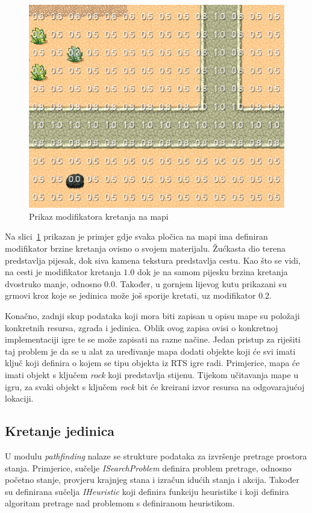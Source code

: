 \documentclass[times, utf8, zavrsni, numeric]{fer}
\begin{document}
\begin{figure}[h]
	\centering
	\includegraphics[width=0.6\linewidth]{images/tileModifiers.png}
	\caption{Prikaz modifikatora kretanja na mapi}
	\label{fig:tileModifiers}
\end{figure}

\par Na slici~\ref{fig:tileModifiers} prikazan je primjer gdje svaka pločica na mapi ima definiran modifikator brzine kretanja ovisno o svojem materijalu.
Žućkasta dio terena predstavlja pijesak, dok siva kamena tekstura predstavlja cestu.
Kao što se vidi, na cesti je modifikator kretanja \(1.0\) dok je na samom pijesku brzina kretanja dvostruko manje, odnosno \(0.0\).
Također, u gornjem lijevog kutu prikazani su grmovi kroz koje se jedinica može još sporije kretati, uz modifikator \(0.2\).

\par Konačno, zadnji skup podataka koji mora biti zapisan u opisu mape su položaji konkretnih resursa, zgrada i jedinica.
Oblik ovog zapisa ovisi o konkretnoj implementaciji igre te se može zapisati na razne načine.
Jedan pristup za riješiti taj problem je da se u alat za uređivanje mapa dodati objekte koji će svi imati ključ koji definira o kojem se tipu objekta  iz RTS igre radi.
Primjerice, mapa će imati objekt s ključem \textit{rock} koji predstavlja stijenu.
Tijekom učitavanja mape u igru, za svaki objekt s ključem \textit{rock} bit će kreirani izvor resursa na odgovarajućoj lokaciji.

\subsection{Kretanje jedinica}

\par U modulu \textit{pathfinding} nalaze se strukture podataka za izvršenje pretrage prostora stanja.
Primjerice, sučelje \textit{ISearchProblem} definira problem pretrage, odnosno početno stanje, provjeru krajnjeg stana i izračun idućih stanja i akcija. 
Također su definirana sučelja \textit{IHeuristic} koji definira funkciju heuristike i  koji definira algoritam pretrage nad problemom s definiranom heuristikom.
\end{document}
